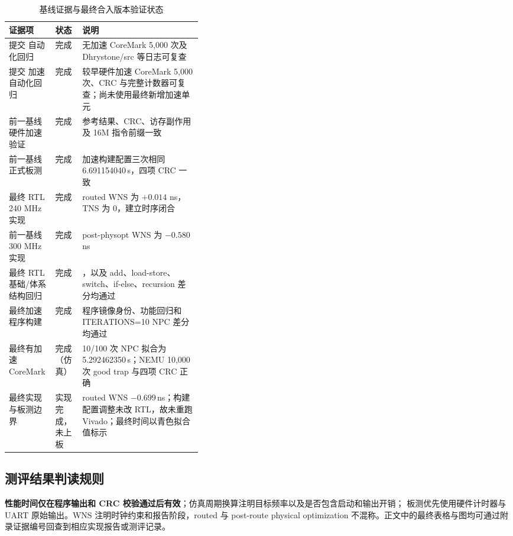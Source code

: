 \begin{table}[H]\centering
\caption{基线证据与最终合入版本验证状态}\label{tab:verification-status}
\small
\begin{tabularx}{\linewidth}{@{}p{0.24\linewidth}p{0.14\linewidth}Y@{}}
\toprule
\textbf{证据项}&\textbf{状态}&\textbf{说明}\\\midrule
提交  自动化回归&完成&无加速 CoreMark 5,000 次及 Dhrystone/src 等日志可复查\\
提交  加速自动化回归&完成&较早硬件加速 CoreMark 5,000 次、CRC 与完整计数器可复查；尚未使用最终新增加速单元\\
前一基线硬件加速验证&完成&参考结果、CRC、访存副作用及 16M 指令前缀一致\\
前一基线正式板测&完成&加速构建配置三次相同 6.691154040\,s，四项 CRC 一致\\
最终 RTL 240 MHz 实现&完成&routed WNS 为 $+0.014$ ns，TNS 为 0，建立时序闭合\\
前一基线 300 MHz 实现&完成&post-physopt WNS 为 $-0.580$ ns\\
最终 RTL 基础/体系结构回归&完成&，以及 add、load-store、switch、if-else、recursion 差分均通过\\
最终加速程序构建&完成&程序镜像身份、功能回归和 ITERATIONS=10 NPC 差分均通过\\
最终有加速 CoreMark&完成（仿真）&10/100 次 NPC 拟合为 5.292462350\,s；NEMU 10,000 次 good trap 与四项 CRC 正确\\
最终实现与板测边界&实现完成，未上板&routed WNS $-0.699$\,ns；构建配置调整未改 RTL，故未重跑 Vivado；最终时间以青色拟合值标示\\
\bottomrule
\end{tabularx}
\end{table}

\subsection{测评结果判读规则}

\textbf{性能时间仅在程序输出和 CRC 校验通过后有效}；仿真周期换算注明目标频率以及是否包含启动和输出开销；
板测优先使用硬件计时器与 UART 原始输出。WNS 注明时钟约束和报告阶段，routed 与 post-route physical
optimization 不混称。正文中的最终表格与图均可通过附录证据编号回查到相应实现报告或测评记录。
